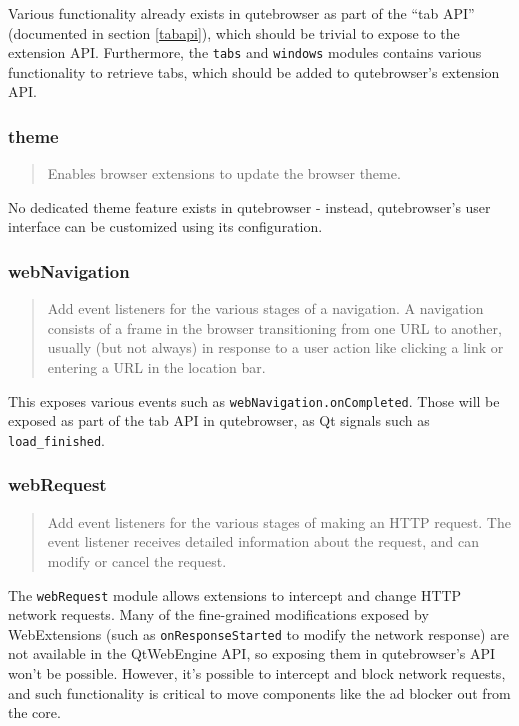 \documentclass[a4paper,parskip=full,DIV=14,BCOR=15mm]{scrreprt}
\begin{document}
Various functionality already exists in qutebrowser as part of the ``tab API''
(documented in section \ref{tabapi}), which should be trivial to expose to the
extension API. Furthermore, the \verb|tabs| and \verb|windows| modules contains
various functionality to retrieve tabs, which should be added to qutebrowser's
extension API.

\subsubsection{theme}
\begin{quote}
Enables browser extensions to update the browser theme.
\end{quote}

No dedicated theme feature exists in qutebrowser - instead, qutebrowser's user
interface can be customized using its configuration.

\subsubsection{webNavigation}
\begin{quote}
Add event listeners for the various stages of a navigation. A navigation consists of a frame in the browser transitioning from one URL to another, usually (but not always) in response to a user action like clicking a link or entering a URL in the location bar.
\end{quote}

This exposes various events such as \verb|webNavigation.onCompleted|. Those will
be exposed as part of the tab API in qutebrowser, as Qt signals such as \verb|load_finished|.

\subsubsection{webRequest}
\begin{quote}
Add event listeners for the various stages of making an HTTP request. The event listener receives detailed information about the request, and can modify or cancel the request.
\end{quote}

The \verb|webRequest| module allows extensions to intercept and change HTTP
network requests. Many of the fine-grained modifications exposed by
WebExtensions (such as \verb|onResponseStarted| to modify the network response)
are not available in the QtWebEngine API, so exposing them in qutebrowser's API
won't be possible. However, it's possible to intercept and block network
requests, and such functionality is critical to move components like the ad
blocker out from the core.
\end{document}
